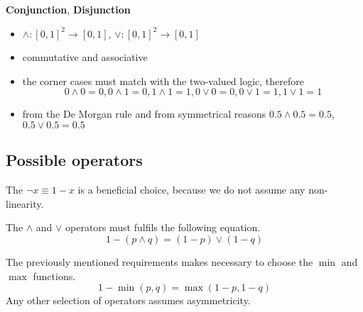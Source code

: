 \documentclass[a4paper,12pt]{article}
\begin{document}
\noindent \textbf{Conjunction}, \textbf{Disjunction}
\begin{itemize}
\item $\wedge: [0, 1]^2 \rightarrow [0, 1]$, $\vee: [0, 1]^2 \rightarrow [0, 1]$
\item commutative and associative
\item the corner cases must match with the two-valued logic, therefore
$$
0 \wedge 0 = 0, 0 \wedge 1 = 0, 1 \wedge 1 = 1, 0 \vee 0 = 0, 0 \vee 1 = 1, 1 \vee 1 = 1
$$
\item from the De Morgan rule and from symmetrical reasons $0.5 \wedge 0.5 = 0.5$, $0.5 \vee 0.5 = 0.5$
\end{itemize}

\subsection{Possible operators}

The $\neg x \equiv 1 - x$ is a beneficial choice, because we do not assume any non-linearity.

The $\wedge$ and $\vee$ operators must fulfils the following equation.
\begin{equation}
1 - (p \wedge q) =  (1 - p) \vee (1 - q)
\end{equation}

The previously mentioned requirements makes necessary to choose the $\min$ and $\max$ functions.
\begin{equation}
1 - \min(p, q) = \max(1 - p, 1 - q)
\end{equation}
Any other selection of operators assumes asymmetricity.
\end{document}
